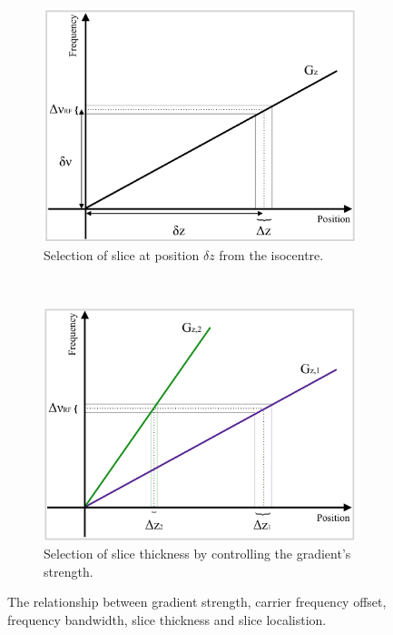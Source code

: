 \begin{figure}[ht]
    \centering
    \begin{subfigure}[b]{0.48\textwidth}
        \includegraphics[width=\textwidth]{images/mri/ch9sliceselect1}
        \caption{Selection of slice at position $\delta z$ from the isocentre.}
        \label{fig:ch9sliceselect1}
    \end{subfigure}
    ~ %
    \begin{subfigure}[b]{0.48\textwidth}
        \includegraphics[width=\textwidth]{images/mri/ch9sliceselect2}
        \caption{Selection of slice thickness by controlling the gradient's strength.}
        \label{fig:ch9sliceselect2}
    \end{subfigure}
    
    \caption{The relationship between gradient strength, carrier frequency offset, frequency bandwidth, slice thickness and slice localistion.}
    \label{fig:ch9sliceselect}
\end{figure}

